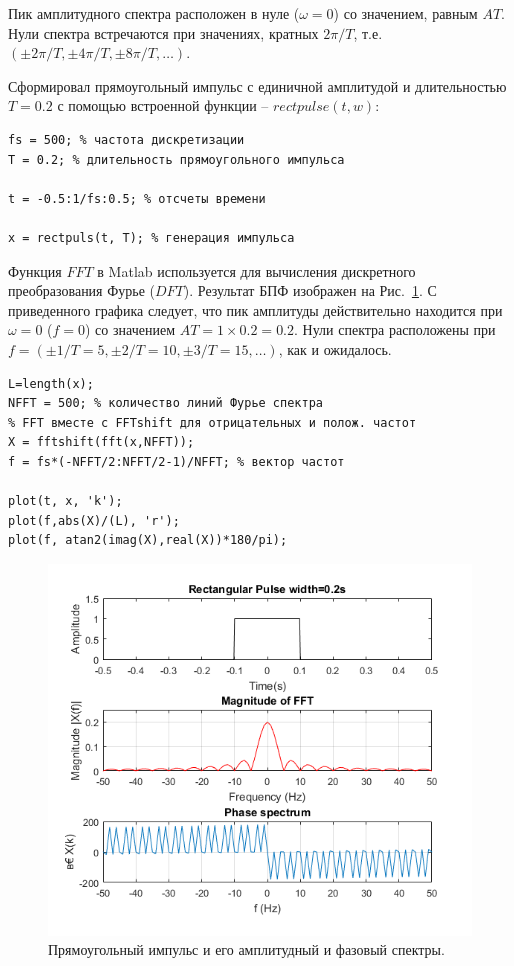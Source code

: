 \documentclass[12pt,a4paper]{article}
\begin{document}
Пик амплитудного спектра расположен в нуле ($\omega=0$) со значением, равным $AT$. Нули спектра встречаются при значениях, кратных $2\pi/T$, т.е. $(\pm 2\pi/T, \pm 4\pi/T, \pm 8\pi/T, \ldots)$.

Сформировал прямоугольный импульс с единичной амплитудой и длительностью $T=0.2$ с помощью встроенной функции -- $rectpulse(t,w)$:
\begin{verbatim}
fs = 500; % частота дискретизации
T = 0.2; % длительность прямоугольного импульса

t = -0.5:1/fs:0.5; % отсчеты времени
 
x = rectpuls(t, T); % генерация импульса
\end{verbatim}

Функция $FFT$ в Matlab используется для вычисления дискретного преобразования Фурье ($DFT$). Результат БПФ изображен на Рис.~\ref{img:sp_rect_pulse}. С приведенного графика следует, что пик амплитуды действительно находится при $\omega=0$ ($f=0$) со значением $AT=1\times 0.2=0.2$. Нули спектра расположены при $f=(\pm 1/T=5, \pm 2/T=10, \pm 3/T=15,\ldots)$, как и ожидалось.
\begin{verbatim}
L=length(x);
NFFT = 500; % количество линий Фурье спектра
% FFT вместе с FFTshift для отрицательных и полож. частот
X = fftshift(fft(x,NFFT));
f = fs*(-NFFT/2:NFFT/2-1)/NFFT; % вектор частот

plot(t, x, 'k');
plot(f,abs(X)/(L), 'r');
plot(f, atan2(imag(X),real(X))*180/pi);
\end{verbatim}
\begin{figure}[H]
\includegraphics[width=\linewidth]{sp_rect_pulse}
\caption{Прямоугольный импульс и его амплитудный и фазовый спектры.}
\label{img:sp_rect_pulse}
\end{figure}
\end{document}
